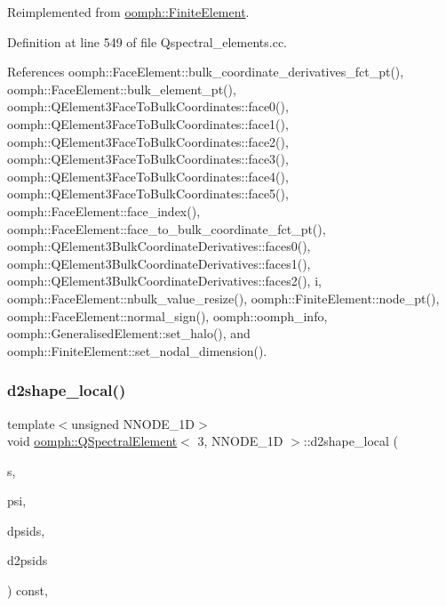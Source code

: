 Reimplemented from \hyperlink{classoomph_1_1FiniteElement_aaf7bead5b462cfd5401d97b3dbdc7af7}{oomph\+::\+Finite\+Element}.



Definition at line 549 of file Qspectral\+\_\+elements.\+cc.



References oomph\+::\+Face\+Element\+::bulk\+\_\+coordinate\+\_\+derivatives\+\_\+fct\+\_\+pt(), oomph\+::\+Face\+Element\+::bulk\+\_\+element\+\_\+pt(), oomph\+::\+Q\+Element3\+Face\+To\+Bulk\+Coordinates\+::face0(), oomph\+::\+Q\+Element3\+Face\+To\+Bulk\+Coordinates\+::face1(), oomph\+::\+Q\+Element3\+Face\+To\+Bulk\+Coordinates\+::face2(), oomph\+::\+Q\+Element3\+Face\+To\+Bulk\+Coordinates\+::face3(), oomph\+::\+Q\+Element3\+Face\+To\+Bulk\+Coordinates\+::face4(), oomph\+::\+Q\+Element3\+Face\+To\+Bulk\+Coordinates\+::face5(), oomph\+::\+Face\+Element\+::face\+\_\+index(), oomph\+::\+Face\+Element\+::face\+\_\+to\+\_\+bulk\+\_\+coordinate\+\_\+fct\+\_\+pt(), oomph\+::\+Q\+Element3\+Bulk\+Coordinate\+Derivatives\+::faces0(), oomph\+::\+Q\+Element3\+Bulk\+Coordinate\+Derivatives\+::faces1(), oomph\+::\+Q\+Element3\+Bulk\+Coordinate\+Derivatives\+::faces2(), i, oomph\+::\+Face\+Element\+::nbulk\+\_\+value\+\_\+resize(), oomph\+::\+Finite\+Element\+::node\+\_\+pt(), oomph\+::\+Face\+Element\+::normal\+\_\+sign(), oomph\+::oomph\+\_\+info, oomph\+::\+Generalised\+Element\+::set\+\_\+halo(), and oomph\+::\+Finite\+Element\+::set\+\_\+nodal\+\_\+dimension().

\mbox{\label{classoomph_1_1QSpectralElement_3_013_00_01NNODE__1D_01_4_a77b8178ee8422de10a218e5cd636db72}} 
\subsubsection{\texorpdfstring{d2shape\+\_\+local()}{d2shape\_local()}}
{\footnotesize\ttfamily template$<$unsigned N\+N\+O\+D\+E\+\_\+1D$>$ \\
void \hyperlink{classoomph_1_1QSpectralElement}{oomph\+::\+Q\+Spectral\+Element}$<$ 3, N\+N\+O\+D\+E\+\_\+1D $>$\+::d2shape\+\_\+local (\begin{DoxyParamCaption}\item[{const \hyperlink{classoomph_1_1Vector}{Vector}$<$ double $>$ \&}]{s,  }\item[{\hyperlink{classoomph_1_1Shape}{Shape} \&}]{psi,  }\item[{\hyperlink{classoomph_1_1DShape}{D\+Shape} \&}]{dpsids,  }\item[{\hyperlink{classoomph_1_1DShape}{D\+Shape} \&}]{d2psids }\end{DoxyParamCaption}) const\hspace{0.3cm}{\ttfamily [inline]}, {\ttfamily [virtual]}}



